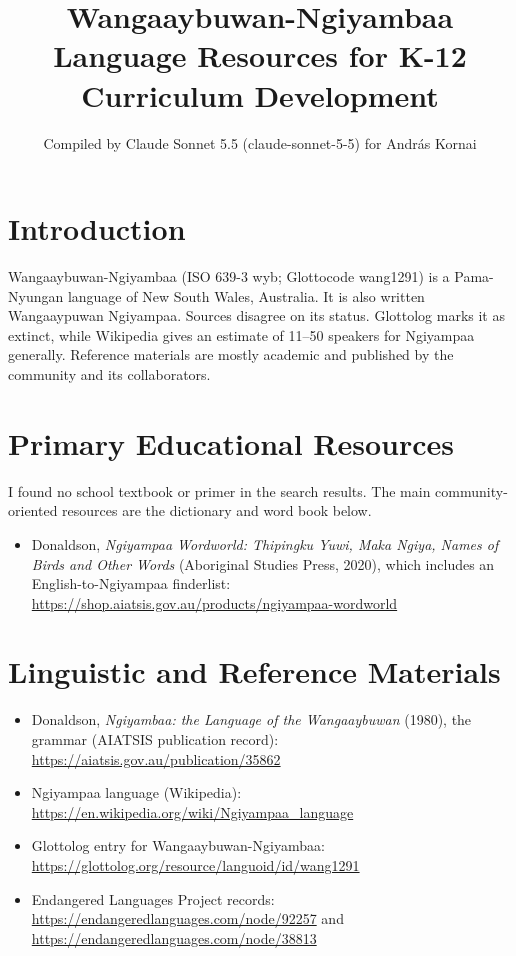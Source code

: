 \documentclass[12pt]{article}
\title{Wangaaybuwan-Ngiyambaa Language Resources for K-12 Curriculum Development}
\author{Compiled by Claude Sonnet 5.5 (claude-sonnet-5-5) for Andr\'as Kornai}
\date{}
\begin{document}
\maketitle

\section{Introduction}
Wangaaybuwan-Ngiyambaa (ISO 639-3 wyb; Glottocode wang1291) is a Pama-Nyungan language of New South Wales, Australia. It is also written Wangaaypuwan Ngiyampaa. Sources disagree on its status. Glottolog marks it as extinct, while Wikipedia gives an estimate of 11--50 speakers for Ngiyampaa generally. Reference materials are mostly academic and published by the community and its collaborators.

\section{Primary Educational Resources}
I found no school textbook or primer in the search results. The main community-oriented resources are the dictionary and word book below.
\begin{itemize}
\item Donaldson, \emph{Ngiyampaa Wordworld: Thipingku Yuwi, Maka Ngiya, Names of Birds and Other Words} (Aboriginal Studies Press, 2020), which includes an English-to-Ngiyampaa finderlist: \url{https://shop.aiatsis.gov.au/products/ngiyampaa-wordworld}
\end{itemize}

\section{Linguistic and Reference Materials}
\begin{itemize}
\item Donaldson, \emph{Ngiyambaa: the Language of the Wangaaybuwan} (1980), the grammar (AIATSIS publication record): \url{https://aiatsis.gov.au/publication/35862}
\item Ngiyampaa language (Wikipedia): \url{https://en.wikipedia.org/wiki/Ngiyampaa_language}
\item Glottolog entry for Wangaaybuwan-Ngiyambaa: \url{https://glottolog.org/resource/languoid/id/wang1291}
\item Endangered Languages Project records: \url{https://endangeredlanguages.com/node/92257} and \url{https://endangeredlanguages.com/node/38813}
\end{itemize}
\end{document}
